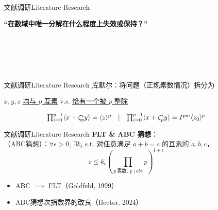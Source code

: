 \documentclass[aspectratio=169]{beamer}
\begin{document}
    \begin{frame}{文献调研}{Literature Research}
    \begin{center}
    \textbf{“在数域中唯一分解在什么程度上失效或保持？”}
    \end{center}
    \\
    \\
    \\
    \\
    \end{frame}
    
    \begin{frame}{文献调研}{Literature Research}
    库默尔：将问题（正规素数情况）拆分为 \\
    \begin{center}
    $x,y,z$ \underline{均与 $p$ 互素} v.s. \underline{恰有一个被 $p$ 整除}
    \end{center}
    \begin{equation}
    \notag
    \begin{matrix}
        \prod_{i=0}^{p-1}\langle x+\zeta_p^iy\rangle = \langle z\rangle^p & \mid & \prod_{i=0}^{p-1}\langle x+\zeta_p^iy\rangle = I^{pm} \langle z_0\rangle^p
    \end{matrix}
    \end{equation}
    \end{frame}
    
    \begin{frame}{文献调研}{Literature Research}
    \textbf{FLT \& ABC 猜想}：\\
    \vspace{10pt}
    （ABC猜想）：$\forall \epsilon > 0$, $\exists k_\epsilon$ s.t. 对任意满足 $a+b=c$ 的互素的 $a, b, c$，
    $$
    c \leq k_\epsilon \left(\prod_{p \ \text{素数}, \ p \mid abc} p\right)^{1+\epsilon}
    $$
    \begin{itemize}
    \item ABC $\implies$ FLT（Goldfeld, 1999）
    \item ABC猜想次指数界的改良（Hector, 2024）
    \end{itemize}
    \end{frame}
    
\end{document}
